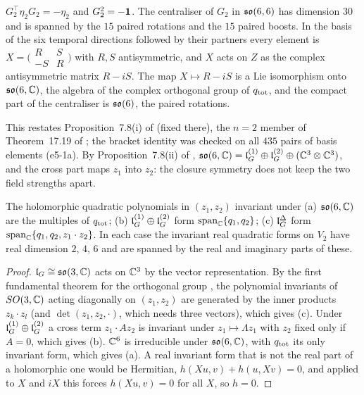 \begin{proposition}
\label{e5:prop:so6C}
$G_2^{\!\top}\eta_2G_2=-\eta_2$ and $G_2^2=-\mathbf 1$. The centraliser of $G_2$ in $\mathfrak{so}(6,6)$ has dimension $30$ and is spanned by the $15$ paired
rotations and the $15$ paired boosts. In the basis of the six temporal directions followed by their partners every element is
$X=\bigl(\begin{smallmatrix}R&S\\-S&R\end{smallmatrix}\bigr)$ with $R,S$ antisymmetric, and $X$ acts on $Z$ as the complex antisymmetric matrix
$R-iS$. The map $X\mapsto R-iS$ is a Lie isomorphism onto $\mathfrak{so}(6,\mathbb{C})$, the algebra of the complex orthogonal group of $q_{\rm tot}$, and the
compact part of the centraliser is $\mathfrak{so}(6)$, the paired rotations.
\end{proposition}

This restates Proposition~7.8(i) of \cite{RE} (fixed there), the $n=2$ member of Theorem~17.19 of \cite{ES17}; the bracket identity was checked
on all $435$ pairs of basis elements (e5-1a). By Proposition~7.8(ii) of \cite{RE}, $\mathfrak{so}(6,\mathbb{C})=\mathfrak l_G^{(1)}\oplus\mathfrak l_G^{(2)}\oplus(\mathbb{C}^3\otimes\mathbb{C}^3)$,
and the cross part maps $z_1$ into $z_2$: the closure symmetry does not keep the two field strengths apart.

\begin{proposition}
\label{e5:prop:quad}
The holomorphic quadratic polynomials in $(z_1,z_2)$ invariant under
(a) $\mathfrak{so}(6,\mathbb{C})$ are the multiples of $q_{\rm tot}$;
(b) $\mathfrak l_G^{(1)}\oplus\mathfrak l_G^{(2)}$ form $\operatorname{span}_{\mathbb{C}}\{q_1,q_2\}$;
(c) $\mathfrak l_G^\Delta$ form $\operatorname{span}_{\mathbb{C}}\{q_1,q_2,z_1\cdot z_2\}$.
In each case the invariant real quadratic forms on $V_2$ have real dimension $2$, $4$, $6$ and are spanned by the real and imaginary parts of these.
\end{proposition}

\begin{proof}
$\mathfrak l_G\cong\mathfrak{so}(3,\mathbb{C})$ acts on $\mathbb{C}^3$ by the vector representation. By the first fundamental theorem for the orthogonal group \cite{Weyl39},
the polynomial invariants of $SO(3,\mathbb{C})$ acting diagonally on $(z_1,z_2)$ are generated by the inner products $z_k\cdot z_l$ (and
$\det(z_1,z_2,\cdot)$, which needs three vectors), which gives (c). Under $\mathfrak l_G^{(1)}\oplus\mathfrak l_G^{(2)}$ a cross term $z_1\cdot Az_2$ is invariant
under $z_1\mapsto\Lambda z_1$ with $z_2$ fixed only if $A=0$, which gives (b). $\mathbb{C}^6$ is irreducible under $\mathfrak{so}(6,\mathbb{C})$, with $q_{\rm tot}$ its
only invariant form, which gives (a). A real invariant form that is not the real part of a holomorphic one would be Hermitian, $h(Xu,v)+h(u,Xv)=0$,
and applied to $X$ and $iX$ this forces $h(Xu,v)=0$ for all $X$, so $h=0$.
\end{proof}

